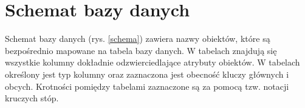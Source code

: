 \newpage

\section{Schemat bazy danych}
\label{sec:modelBazyDanych}

Schemat bazy danych (rys. \ref{schema}) zawiera nazwy obiektów, które są bezpośrednio mapowane na tabela bazy danych. W tabelach znajdują się wszystkie kolumny dokładnie odzwierciedlające atrybuty obiektów. W tabelach określony jest typ kolumny oraz zaznaczona jest obecność kluczy głównych i obcych. Krotności pomiędzy tabelami zaznaczone są za pomocą tzw. notacji kruczych stóp.

\noindent
\begin{minipage}{\linewidth}
\label{schema}
\end{minipage}

\newpage


